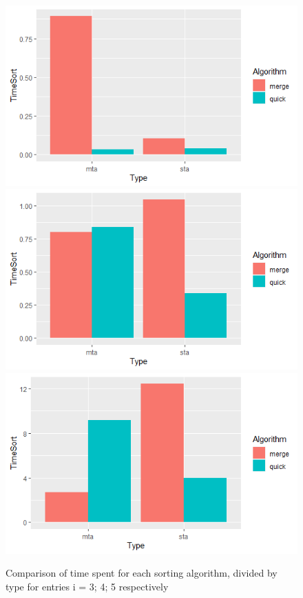 \documentclass[twocolumn]{article}
\begin{document}
\begin{figure}[h]
	\includegraphics[scale=0.5]{./figures/exp2_comparison_i3_sort.png}
	\includegraphics[scale=0.5]{./figures/exp2_comparison_i4_sort.png}
	\includegraphics[scale=0.5]{./figures/exp2_comparison_i5_sort.png}
	\centering
	\caption{Comparison of time spent for each sorting algorithm, divided by type for entries i = 3; 4; 5 respectively}
	\label{fig:exp2}
\end{figure}
\end{document}
